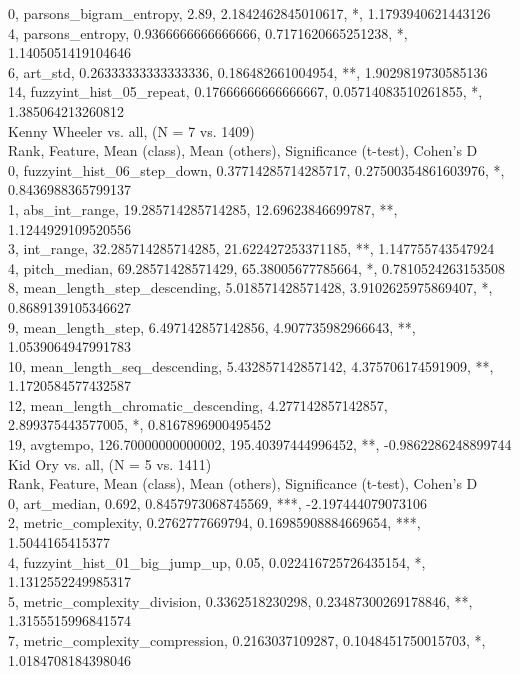 0, parsons_bigram_entropy, 2.89, 2.1842462845010617, *, 1.1793940621443126\\
4, parsons_entropy, 0.9366666666666666, 0.7171620665251238, *, 1.1405051419104646\\
6, art_std, 0.26333333333333336, 0.186482661004954, **, 1.9029819730585136\\
14, fuzzyint_hist_05_repeat, 0.17666666666666667, 0.05714083510261855, *, 1.385064213260812\\
Kenny Wheeler vs. all, (N = 7 vs. 1409)\\
Rank, Feature, Mean (class), Mean (others), Significance (t-test), Cohen's D\\
0, fuzzyint_hist_06_step_down, 0.37714285714285717, 0.27500354861603976, *, 0.8436988365799137\\
1, abs_int_range, 19.285714285714285, 12.69623846699787, **, 1.1244929109520556\\
3, int_range, 32.285714285714285, 21.622427253371185, **, 1.147755743547924\\
4, pitch_median, 69.28571428571429, 65.38005677785664, *, 0.7810524263153508\\
8, mean_length_step_descending, 5.018571428571428, 3.9102625975869407, *, 0.8689139105346627\\
9, mean_length_step, 6.497142857142856, 4.907735982966643, **, 1.0539064947991783\\
10, mean_length_seq_descending, 5.432857142857142, 4.375706174591909, **, 1.1720584577432587\\
12, mean_length_chromatic_descending, 4.277142857142857, 2.899375443577005, *, 0.8167896900495452\\
19, avgtempo, 126.70000000000002, 195.40397444996452, **, -0.9862286248899744\\
Kid Ory vs. all, (N = 5 vs. 1411)\\
Rank, Feature, Mean (class), Mean (others), Significance (t-test), Cohen's D\\
0, art_median, 0.692, 0.8457973068745569, ***, -2.197444079073106\\
2, metric_complexity, 0.2762777669794, 0.16985908884669654, ***, 1.5044165415377\\
4, fuzzyint_hist_01_big_jump_up, 0.05, 0.022416725726435154, *, 1.1312552249985317\\
5, metric_complexity_division, 0.3362518230298, 0.23487300269178846, **, 1.3155515996841574\\
7, metric_complexity_compression, 0.2163037109287, 0.1048451750015703, *, 1.0184708184398046\\
